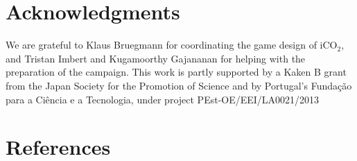 \documentclass[preprint,authoryear,12pt]{elsarticle}
\begin{document}
\section{Acknowledgments}
We are grateful to Klaus Bruegmann for coordinating the game design of iCO$_2$, and Tristan Imbert and Kugamoorthy Gajananan for helping with the preparation of the campaign.
This work is partly supported by a Kaken B grant from the Japan Society for the Promotion of Science and by Portugal’s Fundação para a Ciência e a Tecnologia, under project
PEst-OE/EEI/LA0021/2013



\section*{References}











\end{document}
